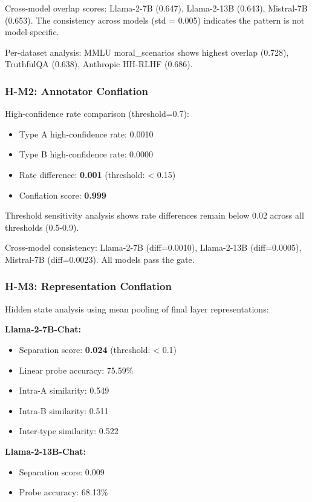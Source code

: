 Cross-model overlap scores: Llama-2-7B (0.647), Llama-2-13B (0.643), Mistral-7B (0.653). The consistency across models (std = 0.005) indicates the pattern is not model-specific.

Per-dataset analysis: MMLU moral\_scenarios shows highest overlap (0.728), TruthfulQA (0.638), Anthropic HH-RLHF (0.686).

\subsubsection{H-M2: Annotator Conflation}

High-confidence rate comparison (threshold=0.7):

\begin{itemize}
\item Type A high-confidence rate: 0.0010
\item Type B high-confidence rate: 0.0000
\item Rate difference: \textbf{0.001} (threshold: < 0.15)
\item Conflation score: \textbf{0.999}
\end{itemize}

Threshold sensitivity analysis shows rate differences remain below 0.02 across all thresholds (0.5-0.9).

Cross-model consistency: Llama-2-7B (diff=0.0010), Llama-2-13B (diff=0.0005), Mistral-7B (diff=0.0023). All models pass the gate.

\subsubsection{H-M3: Representation Conflation}

Hidden state analysis using mean pooling of final layer representations:

\textbf{Llama-2-7B-Chat:}
\begin{itemize}
\item Separation score: \textbf{0.024} (threshold: < 0.1)
\item Linear probe accuracy: 75.59\%
\item Intra-A similarity: 0.549
\item Intra-B similarity: 0.511
\item Inter-type similarity: 0.522
\end{itemize}

\textbf{Llama-2-13B-Chat:}
\begin{itemize}
\item Separation score: 0.009
\item Probe accuracy: 68.13\%
\end{itemize}

